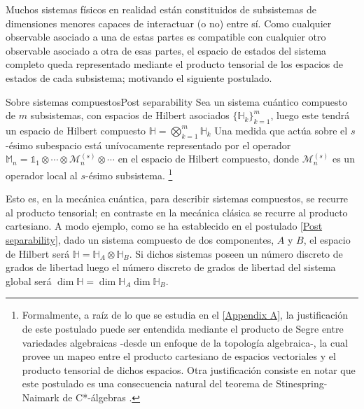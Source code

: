 \documentclass{report} %
\numberwithin{equation}{section}
\begin{document}
Muchos sistemas físicos en realidad están constituidos de subsistemas de dimensiones menores capaces de interactuar (o no) entre sí. Como cualquier observable asociado a una de estas partes es compatible con cualquier otro observable asociado a otra de esas partes, el espacio de estados del sistema completo queda representado mediante el producto tensorial de los espacios de estados de cada subsistema; motivando el siguiente postulado.

\begin{post}{Sobre sistemas compuestos}{Post separability}
Sea un sistema cuántico compuesto de $m$ subsistemas, con espacios de Hilbert asociados $\{\mathds{H}_k\}_{k=1}^{m}$, luego este tendrá un espacio de Hilbert compuesto $\mathds{H} = \bigotimes_{k=1}^{m} \mathds{H}_{k}$ Una medida que actúa sobre el $s$-ésimo subespacio está unívocamente representado por el operador $ \mathds{M}_n = \mathds{1}_1 \otimes \cdots \otimes \mathcal{M}_n^{(s)} \otimes \cdots $ en el espacio de Hilbert compuesto, donde $\mathcal{M}_n^{(s)}$ es un operador local al $s$-ésimo subsistema. \footnote{Formalmente, a raíz de lo que se estudia en el \autoref{Appendix A}, la justificación de este postulado puede ser entendida mediante el producto de Segre entre variedades algebraicas \cite{GoldbartStone} -desde un enfoque de la topología algebraica-, la cual provee un mapeo entre el producto cartesiano de espacios vectoriales y el producto tensorial de dichos espacios. Otra justificación consiste en notar que este postulado es una consecuencia natural del teorema de Stinespring-Naimark de C*-álgebras \cite{Stinespring}. }
\label{Post separability}
\end{post}

Esto es, en la mecánica cuántica, para describir sistemas compuestos, se recurre al producto tensorial; en contraste en la mecánica clásica se recurre al producto cartesiano. A modo ejemplo, como se ha establecido en el postulado \ref{Post separability}, dado un sistema compuesto de dos componentes, $A$ y $B$, el espacio de Hilbert será $\mathbb{H} = \mathbb{H}_{A}\otimes \mathbb{H}_{B}$. Si dichos sistemas poseen un número discreto de grados de libertad luego el número discreto de grados de libertad del sistema global será $\dim \mathbb{H} = \dim\mathbb{H}_{A}\dim\mathbb{H}_{B}$. \\
\end{document}
